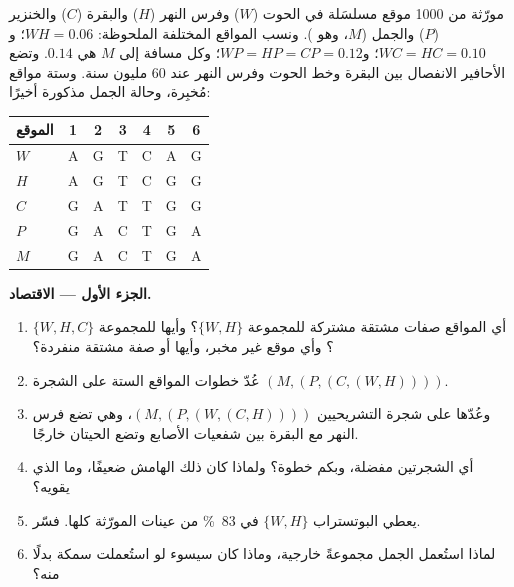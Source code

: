 \begin{problem}
\label{pb:b2:phylogenetic-trees:1}
مورّثة من \num{1000} موقع مسلسَلة في الحوت ($W$) وفرس النهر
($H$) والبقرة ($C$) والخنزير ($P$) والجمل ($M$، وهو ). ونسب
المواقع المختلفة الملحوظة: $WH = 0.06$؛ و$WC = HC = 0.10$؛ و$WP =
HP = CP = 0.12$؛ وكل مسافة إلى $M$ هي $0.14$. وتضع الأحافير
الانفصال بين البقرة وخط الحوت وفرس النهر عند 60 مليون سنة.
وستة مواقع مُخبِرة، وحالة الجمل مذكورة أخيرًا:
\begin{center}
\begin{tabular}{l@{\quad}cccccc}
الموقع & 1 & 2 & 3 & 4 & 5 & 6 \\ \hline
$W$ & A & G & T & C & A & G \\
$H$ & A & G & T & C & G & G \\
$C$ & G & A & T & T & G & G \\
$P$ & G & A & C & T & G & A \\
$M$ & G & A & C & T & G & A \\
\end{tabular}
\end{center}

\medskip
\noindent\textbf{الجزء الأول --- الاقتصاد.}
\begin{enumerate}
  \item أي المواقع صفات مشتقة مشتركة للمجموعة $\{W, H\}$؟ وأيها للمجموعة $\{W, H,
        C\}$؟ وأي موقع غير مخبر، وأيها 
        أو صفة مشتقة منفردة؟
  \item عُدّ خطوات المواقع الستة على الشجرة
        $(M,(P,(C,(W,H))))$.
  \item وعُدّها على شجرة التشريحيين $(M,(P,(W,(C,H))))$،
        وهي تضع فرس النهر مع البقرة بين شفعيات الأصابع وتضع
        الحيتان خارجًا.
  \item أي الشجرتين مفضلة، وبكم خطوة؟ ولماذا كان ذلك
        الهامش ضعيفًا، وما الذي يقويه؟
  \item يعطي البوتستراب  $\{W, H\}$ في \qty{83}{\%} من
        عينات المورّثة كلها. فسّر.
  \item لماذا استُعمل الجمل مجموعةً خارجية، وماذا كان
        سيسوء لو استُعملت سمكة بدلًا منه؟
\end{enumerate}


\end{problem}
